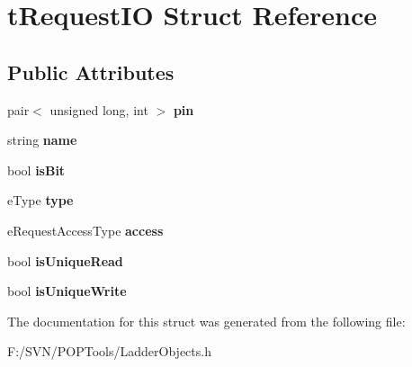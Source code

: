 \hypertarget{structt_request_i_o}{\section{t\-Request\-I\-O Struct Reference}
\label{structt_request_i_o}
}
\subsection*{Public Attributes}
\begin{DoxyCompactItemize}
\item 
\hypertarget{structt_request_i_o_af14b682f28f4dc1be5b354057237b4d8}{pair$<$ unsigned long, int $>$ {\bfseries pin}}\label{structt_request_i_o_af14b682f28f4dc1be5b354057237b4d8}

\item 
\hypertarget{structt_request_i_o_a447242044b570b486cfc5e89a8ddf9da}{string {\bfseries name}}\label{structt_request_i_o_a447242044b570b486cfc5e89a8ddf9da}

\item 
\hypertarget{structt_request_i_o_ae4f6f2b4c298476c6d23999a467b38de}{bool {\bfseries is\-Bit}}\label{structt_request_i_o_ae4f6f2b4c298476c6d23999a467b38de}

\item 
\hypertarget{structt_request_i_o_a99f5728ff2ac6dd62a00902c5669f35c}{e\-Type {\bfseries type}}\label{structt_request_i_o_a99f5728ff2ac6dd62a00902c5669f35c}

\item 
\hypertarget{structt_request_i_o_a19ba55bab3e5f542177eef5c5d021cae}{e\-Request\-Access\-Type {\bfseries access}}\label{structt_request_i_o_a19ba55bab3e5f542177eef5c5d021cae}

\item 
\hypertarget{structt_request_i_o_abbcf245f68227043038b3913af5cfe29}{bool {\bfseries is\-Unique\-Read}}\label{structt_request_i_o_abbcf245f68227043038b3913af5cfe29}

\item 
\hypertarget{structt_request_i_o_ad8da32d280a1df894027fb2f986c4632}{bool {\bfseries is\-Unique\-Write}}\label{structt_request_i_o_ad8da32d280a1df894027fb2f986c4632}

\end{DoxyCompactItemize}


The documentation for this struct was generated from the following file\-:\begin{DoxyCompactItemize}
\item 
F\-:/\-S\-V\-N/\-P\-O\-P\-Tools/Ladder\-Objects.\-h\end{DoxyCompactItemize}
